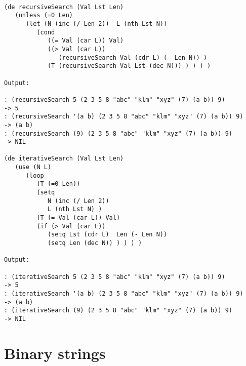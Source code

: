 \begin{verbatim}

(de recursiveSearch (Val Lst Len)
   (unless (=0 Len)
      (let (N (inc (/ Len 2))  L (nth Lst N))
         (cond
            ((= Val (car L)) Val)
            ((> Val (car L))
               (recursiveSearch Val (cdr L) (- Len N)) )
            (T (recursiveSearch Val Lst (dec N))) ) ) ) )

Output:

: (recursiveSearch 5 (2 3 5 8 "abc" "klm" "xyz" (7) (a b)) 9)
-> 5
: (recursiveSearch '(a b) (2 3 5 8 "abc" "klm" "xyz" (7) (a b)) 9)
-> (a b)
: (recursiveSearch (9) (2 3 5 8 "abc" "klm" "xyz" (7) (a b)) 9)
-> NIL

(de iterativeSearch (Val Lst Len)
   (use (N L)
      (loop
         (T (=0 Len))
         (setq
            N (inc (/ Len 2))
            L (nth Lst N) )
         (T (= Val (car L)) Val)
         (if (> Val (car L))
            (setq Lst (cdr L)  Len (- Len N))
            (setq Len (dec N)) ) ) ) )

Output:

: (iterativeSearch 5 (2 3 5 8 "abc" "klm" "xyz" (7) (a b)) 9)
-> 5
: (iterativeSearch '(a b) (2 3 5 8 "abc" "klm" "xyz" (7) (a b)) 9)
-> (a b)
: (iterativeSearch (9) (2 3 5 8 "abc" "klm" "xyz" (7) (a b)) 9)
-> NIL

\end{verbatim}

\section*{Binary strings}

